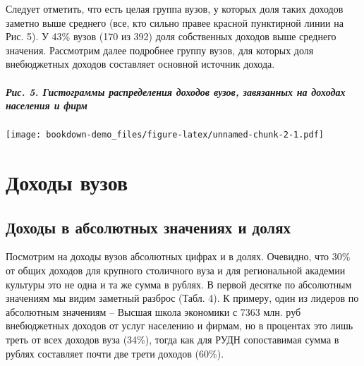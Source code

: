 \documentclass[]{book}
\let\oldparagraph\paragraph
\renewcommand{\paragraph}[1]{\oldparagraph{#1}\mbox{}}
\begin{document}
Следует отметить, что есть целая группа вузов, у которых доля таких доходов заметно выше среднего (все, кто сильно правее красной пунктирной линии на Рис. 5). У 43\% вузов (170 из 392) доля собственных доходов выше среднего значения. Рассмотрим далее подробнее группу вузов, для которых доля внебюджетных доходов составляет основной источник дохода.

\hypertarget{ux440ux438ux441.-5.-ux433ux438ux441ux442ux43eux433ux440ux430ux43cux43cux44b-ux440ux430ux441ux43fux440ux435ux434ux435ux43bux435ux43dux438ux44f-ux434ux43eux445ux43eux434ux43eux432-ux432ux443ux437ux43eux432-ux437ux430ux432ux44fux437ux430ux43dux43dux44bux445-ux43dux430-ux434ux43eux445ux43eux434ux430ux445-ux43dux430ux441ux435ux43bux435ux43dux438ux44f-ux438-ux444ux438ux440ux43c}{%
\paragraph{Рис. 5. Гистограммы распределения доходов вузов, завязанных на доходах населения и фирм}\label{ux440ux438ux441.-5.-ux433ux438ux441ux442ux43eux433ux440ux430ux43cux43cux44b-ux440ux430ux441ux43fux440ux435ux434ux435ux43bux435ux43dux438ux44f-ux434ux43eux445ux43eux434ux43eux432-ux432ux443ux437ux43eux432-ux437ux430ux432ux44fux437ux430ux43dux43dux44bux445-ux43dux430-ux434ux43eux445ux43eux434ux430ux445-ux43dux430ux441ux435ux43bux435ux43dux438ux44f-ux438-ux444ux438ux440ux43c}}

\texttt{[image: bookdown-demo\_files/figure-latex/unnamed-chunk-2-1.pdf]}

\hypertarget{ux434ux43eux445ux43eux434ux44b-ux432ux443ux437ux43eux432}{%
\chapter{Доходы вузов}\label{ux434ux43eux445ux43eux434ux44b-ux432ux443ux437ux43eux432}}

\hypertarget{ux434ux43eux445ux43eux434ux44b-ux432-ux430ux431ux441ux43eux43bux44eux442ux43dux44bux445-ux437ux43dux430ux447ux435ux43dux438ux44fux445-ux438-ux434ux43eux43bux44fux445}{%
\section{Доходы в абсолютных значениях и долях}\label{ux434ux43eux445ux43eux434ux44b-ux432-ux430ux431ux441ux43eux43bux44eux442ux43dux44bux445-ux437ux43dux430ux447ux435ux43dux438ux44fux445-ux438-ux434ux43eux43bux44fux445}}

Посмотрим на доходы вузов абсолютных цифрах и в долях. Очевидно, что 30\% от общих доходов для крупного столичного вуза и для региональной академии культуры это не одна и та же сумма в рублях. В первой десятке по абсолютным значениям мы видим заметный разброс (Табл. 4). К примеру, один из лидеров по абсолютным значениям -- Высшая школа экономики с 7363 млн. руб внебюджетных доходов от услуг населению и фирмам, но в процентах это лишь треть от всех доходов вуза (34\%), тогда как для РУДН сопоставимая сумма в рублях составляет почти две трети доходов (60\%).
\end{document}
